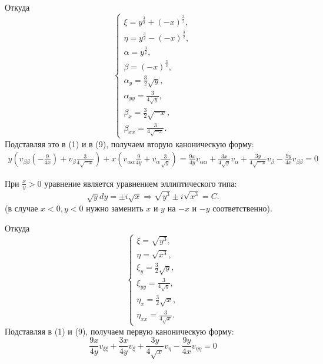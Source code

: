 \documentclass[11pt]{article}
\begin{document}
Откуда
\begin{equation}
\begin{cases}
\xi = y^{\frac32} + (-x)^{\frac32}, \\
\eta = y^{\frac32} - (-x)^{\frac32}, \\
\alpha = y^{\frac32}, \\
\beta = (-x)^{\frac32}, \\
\alpha_y = \frac32\sqrt{y}, \\
\alpha_{yy} = \frac3{4\sqrt{y}}, \\
\beta_x = \frac32\sqrt{-x}, \\
\beta_{xx} = \frac3{4\sqrt{-x}}.
\end{cases}
\end{equation}
Подставляя это в (1) и в (9), получаем вторую каноническую форму:
\begin{multline}
y\left(v_{\beta\beta}\left(-\frac{9}{4x}\right) + v_{\beta}\frac3{4\sqrt{-x}}\right) +
x\left(v_{\alpha\alpha}\frac{9}{4y} + v_{\alpha}\frac3{\sqrt{y}}\right) =
\frac{9x}{4y}v_{\alpha\alpha} + \frac{3x}{4\sqrt{y}}v_{\alpha} + \frac{3y}{4\sqrt{-x}}v_{\beta} -
\frac{9y}{4x}v_{\beta\beta} = 0
\end{multline}

При $\frac{x}y > 0$ уравнение является уравнением эллиптического типа:
\begin{equation*}
\sqrt{y}dy = \pm i\sqrt{x} \Rightarrow \sqrt{y^3} \pm i\sqrt{x^3} = C.
\end{equation*}
(в случае $x < 0, y < 0$ нужно заменить $x$ и $y$ на $-x$ и $-y$ соответственно).

Откуда
\begin{equation}
\begin{cases}
\xi = \sqrt{y^3}, \\
\eta = \sqrt{x^3}, \\
\xi_y = \frac3{2}\sqrt{y}, \\
\xi_{yy} = \frac3{4\sqrt{y}}, \\
\eta_x = \frac3{2}\sqrt{x}, \\
\eta_{xx} = \frac3{4\sqrt{x}}.
\end{cases}
\end{equation}
Подставляя в (1) и (9), получаем первую каноническую форму:
\begin{equation}
\frac{9x}{4y}v_{\xi\xi} + \frac{3x}{4y}v_{\xi} + \frac{3y}{4\sqrt{x}}v_{\eta} - \frac{9y}{4x}v_{\eta\eta} = 0
\end{equation}
\end{document}
